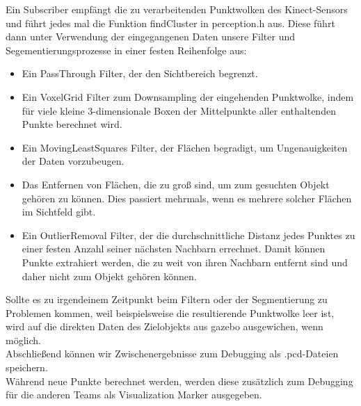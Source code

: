 \documentclass{suturo}
\begin{document}
Ein Subscriber empfängt die zu verarbeitenden Punktwolken des Kinect-Sensors und führt jedes mal die Funktion findCluster in perception.h aus. Diese führt dann unter Verwendung der eingegangenen Daten unsere Filter und Segementierungsprozesse in einer festen Reihenfolge aus:

\begin{itemize} 
\item Ein PassThrough Filter, der den Sichtbereich begrenzt.
\item Ein VoxelGrid Filter zum Downsampling der eingehenden Punktwolke, indem für viele kleine 3-dimensionale Boxen der Mittelpunkte aller enthaltenden Punkte berechnet wird.
\item Ein MovingLeastSquares Filter, der Flächen begradigt, um Ungenauigkeiten der Daten vorzubeugen.
\item Das Entfernen von Flächen, die zu groß sind, um zum gesuchten Objekt gehören zu können. Dies passiert mehrmals, wenn es mehrere solcher Flächen im Sichtfeld gibt.
\item Ein OutlierRemoval Filter, der die durchschnittliche Distanz jedes Punktes zu einer festen Anzahl seiner nächsten Nachbarn errechnet. Damit können Punkte extrahiert werden, die zu weit von ihren Nachbarn entfernt sind und daher nicht zum Objekt gehören können.
\end{itemize}

Sollte es zu irgendeinem Zeitpunkt beim Filtern oder der Segmentierung zu Problemen kommen, weil beispielsweise die resultierende Punktwolke leer ist, wird auf die direkten Daten des Zielobjekts aus gazebo ausgewichen, wenn möglich.
\\
Abschließend können wir Zwischenergebnisse zum Debugging als .pcd-Dateien speichern.
\\
Während neue Punkte berechnet werden, werden diese zusätzlich zum Debugging für die anderen Teams als Visualization Marker ausgegeben.
\end{document}
